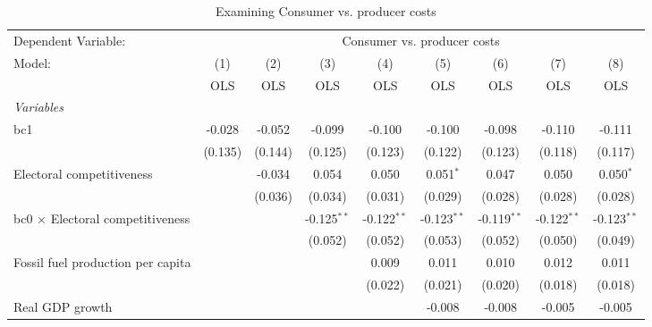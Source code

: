 
\begin{table}[htbp]
   \caption{Examining Consumer vs. producer costs}
   \centering
   \begin{tabular}{lcccccccc}
      \toprule
      Dependent Variable: & \multicolumn{8}{c}{Consumer vs. producer costs}\\
      Model:                                  & (1)     & (2)     & (3)           & (4)           & (5)           & (6)           & (7)           & (8)\\  
                                              &  OLS    & OLS     & OLS           & OLS           & OLS           & OLS           & OLS           & OLS\\  
      \midrule
      \emph{Variables}\\
      bc1                                     & -0.028  & -0.052  & -0.099        & -0.100        & -0.100        & -0.098        & -0.110        & -0.111\\   
                                              & (0.135) & (0.144) & (0.125)       & (0.123)       & (0.122)       & (0.123)       & (0.118)       & (0.117)\\   
      Electoral competitiveness               &         & -0.034  & 0.054         & 0.050         & 0.051$^{*}$   & 0.047         & 0.050         & 0.050$^{*}$\\   
                                              &         & (0.036) & (0.034)       & (0.031)       & (0.029)       & (0.028)       & (0.028)       & (0.028)\\   
      bc0 $\times$ Electoral competitiveness  &         &         & -0.125$^{**}$ & -0.122$^{**}$ & -0.123$^{**}$ & -0.119$^{**}$ & -0.122$^{**}$ & -0.123$^{**}$\\   
                                              &         &         & (0.052)       & (0.052)       & (0.053)       & (0.052)       & (0.050)       & (0.049)\\   
      Fossil fuel production per capita       &         &         &               & 0.009         & 0.011         & 0.010         & 0.012         & 0.011\\   
                                              &         &         &               & (0.022)       & (0.021)       & (0.020)       & (0.018)       & (0.018)\\   
      Real GDP growth                         &         &         &               &               & -0.008        & -0.008        & -0.005        & -0.005\\   

\end{tabular}
\end{table}
